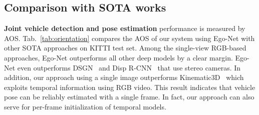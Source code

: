 \documentclass[final]{cvpr}
\begin{document}
\subsection{Comparison with SOTA works} 
\noindent \textbf{Joint vehicle detection and pose estimation} performance is measured by AOS. Tab.~\ref{tab:orientation} compares the AOS of our system using Ego-Net with other SOTA approaches on KITTI test set. Among the single-view RGB-based approaches, Ego-Net outperforms all other deep models by a clear margin. Ego-Net even outperforms DSGN~\cite{chen2020dsgn} and Disp R-CNN~\cite{sun2020disp} that use stereo cameras. In addition, our approach using a single image outperforms Kinematic3D~\cite{kinematic-3d} which exploits temporal information using RGB video. This result indicates that vehicle pose can be reliably estimated with a single frame. In fact, our approach can also serve for per-frame initialization of temporal models.
\end{document}
